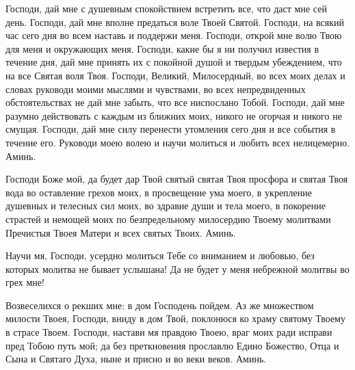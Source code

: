  


Господи, дай мне с душевным спокойствием встретить все, что даст мне сей день. Господи, дай мне вполне предаться воле Твоей Святой. Господи, на всякий час сего дня во всем наставь и поддержи меня. Господи, открой мне волю Твою для меня и окружающих меня. Господи, какие бы я ни получил известия в течение дня, дай мне принять их с покойной душой и твердым убеждением, что на все Святая воля Твоя. Господи, Великий, Милосердный, во всех моих делах и словах руководи моими мыслями и чувствами, во всех непредвиденных обстоятельствах не дай мне забыть, что все ниспослано Тобой. Господи, дай мне разумно действовать с каждым из ближних моих, никого не огорчая и никого не смущая. Господи, дай мне силу перенести утомления сего дня и все события в течение его. Руководи моею волею и научи молиться и любить всех нелицемерно. Аминь.
\mychapterending

 


Господи Боже мой, да будет дар Твой святый святая Твоя просфора и святая Твоя вода во оставление грехов моих, в просвещение ума моего, в укрепление душевных и телесных сил моих, во здравие души и тела моего, в покорение страстей и немощей моих по безпредельному милосердию Твоему молитвами Пречистыя Твоея Матери и всех святых Твоих. Аминь.


\bigskip\mychapterending

 



Научи мя, Господи, усердно молиться Тебе со вниманием и любовью, без которых молитва не бывает услышана! Да не будет у меня небрежной молитвы во грех мне!
\mychapterending

 



Возвеселихся о рекших мне: в дом Господень пойдем. Аз же множеством милости Твоея, Господи, вниду в дом Твой, поклонюся ко храму святому Твоему в страсе Твоем. Господи, настави мя правдою Твоею, враг моих ради исправи пред Тобою путь мой; да без преткновения прославлю Едино Божество, Отца и Сына и Святаго Духа, ныне и присно и во веки веков. Аминь. 
\mychapterending

